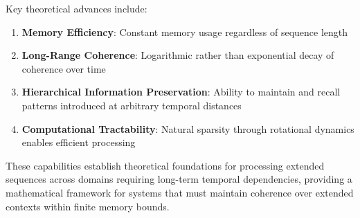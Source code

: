 Key theoretical advances include:

\begin{enumerate}
    \item \textbf{Memory Efficiency}: Constant memory usage regardless of sequence length
    \item \textbf{Long-Range Coherence}: Logarithmic rather than exponential decay of coherence over time
    \item \textbf{Hierarchical Information Preservation}: Ability to maintain and recall patterns introduced at arbitrary temporal distances
    \item \textbf{Computational Tractability}: Natural sparsity through rotational dynamics enables efficient processing
\end{enumerate}

These capabilities establish theoretical foundations for processing extended sequences across domains requiring long-term temporal dependencies, providing a mathematical framework for systems that must maintain coherence over extended contexts within finite memory bounds.